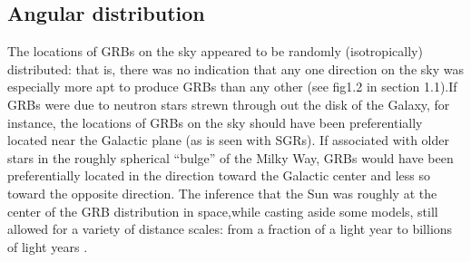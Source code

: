 \subsection{Angular distribution}
The locations of GRBs on the sky appeared to be randomly (isotropically) distributed:
that is, there was no indication that any one direction on the sky was especially
more apt to produce GRBs than any other (see fig1.2 in section 1.1).If GRBs were due to neutron stars strewn through out the disk of the Galaxy, for instance, the locations of GRBs on the sky should have been preferentially located near the Galactic plane (as is seen with SGRs). If associated with older stars in the roughly spherical “bulge” of the Milky Way, GRBs would have been preferentially located in the direction toward the Galactic center and less so toward the opposite direction.
The inference that the Sun was roughly at the center of the GRB distribution in space,while casting aside some models, still allowed for a variety of distance scales: from a fraction of a light year to billions of light years \citep{7}.
